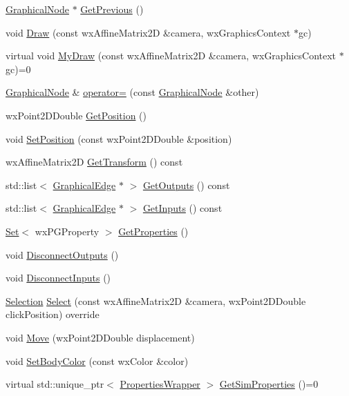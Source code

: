 \begin{DoxyCompactItemize}
\hyperlink{class_graphical_node}{Graphical\+Node} $\ast$ \hyperlink{class_graphical_node_a2e097f9b7b10970e20c530176a5e50b2}{Get\+Previous} ()
\item 
void \hyperlink{class_graphical_node_a5675edef9951820c61973cd8fb242287}{Draw} (const wx\+Affine\+Matrix2D \&camera, wx\+Graphics\+Context $\ast$gc)
\item 
virtual void \hyperlink{class_graphical_node_a4a5d4f48454a9721a940499d4f59b0ce}{My\+Draw} (const wx\+Affine\+Matrix2D \&camera, wx\+Graphics\+Context $\ast$gc)=0
\item 
\hyperlink{class_graphical_node}{Graphical\+Node} \& \hyperlink{class_graphical_node_a9c5dc1b7f344e2785531318167c2826b}{operator=} (const \hyperlink{class_graphical_node}{Graphical\+Node} \&other)
\item 
wx\+Point2\+D\+Double \hyperlink{class_graphical_node_a87de11aad81e7b4a3baf53d47034e5f5}{Get\+Position} ()
\item 
void \hyperlink{class_graphical_node_a61cb6a7d32ae7db370336639d83fc2bd}{Set\+Position} (const wx\+Point2\+D\+Double \&position)
\item 
wx\+Affine\+Matrix2D \hyperlink{class_graphical_node_a3556bb1d323f16fd394211cf82239f01}{Get\+Transform} () const
\item 
std\+::list$<$ \hyperlink{class_graphical_edge}{Graphical\+Edge} $\ast$ $>$ \hyperlink{class_graphical_node_a2d4169669b106f7351178e4fbc60be85}{Get\+Outputs} () const
\item 
std\+::list$<$ \hyperlink{class_graphical_edge}{Graphical\+Edge} $\ast$ $>$ \hyperlink{class_graphical_node_a338a09b81d0be860210659f312fd5347}{Get\+Inputs} () const
\item 
\hyperlink{class_set}{Set}$<$ wx\+P\+G\+Property $>$ \hyperlink{class_graphical_node_a9d89885db9553820d3557a801a83b9de}{Get\+Properties} ()
\item 
void \hyperlink{class_graphical_node_a80e76a5ae9dd27b0445a1e6943074852}{Disconnect\+Outputs} ()
\item 
void \hyperlink{class_graphical_node_adf7b68c28c70426681cef018d34f8988}{Disconnect\+Inputs} ()
\item 
\hyperlink{struct_selection}{Selection} \hyperlink{class_graphical_node_ac73e20f3d4c5cca556e0140ef558f6a4}{Select} (const wx\+Affine\+Matrix2D \&camera, wx\+Point2\+D\+Double click\+Position) override
\item 
void \hyperlink{class_graphical_node_a430fbd68a5d907ed9e73981ab3c499fb}{Move} (wx\+Point2\+D\+Double displacement)
\item 
void \hyperlink{class_graphical_node_ae0cbf2cfe00306e2cfc610c5eb4cb89b}{Set\+Body\+Color} (const wx\+Color \&color)
\item 
virtual std\+::unique\+\_\+ptr$<$ \hyperlink{class_graphical_node_1_1_properties_wrapper}{Properties\+Wrapper} $>$ \hyperlink{class_graphical_node_a2ad6386709ceabfbf97daabf4c6cd64a}{Get\+Sim\+Properties} ()=0
\end{DoxyCompactItemize}
